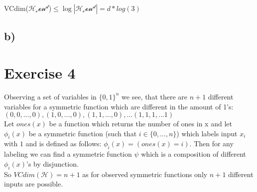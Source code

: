 \documentclass{article}
\begin{document}
VCdim($\mathcal{H_con^d}$)$\leq \log|\mathcal{H_con^d}| = d*log(3)$

\subsection*{b)}

\section*{Exercise 4}
Observing a set of variables in $\{0,1\}^n$ we see, that there are $n+1$ different variables for a symmetric function which are different in the amount of 1's: \\ ${(0,0,..., 0), (1,0,..., 0), (1,1,..., 0), ... (1,1,1, ... 1)}$ \\
Let $ones(x)$ be a function which returns the number of ones in x and let $\phi_i(x)$ be a symmetric function (such that $i\in\{0,..., n\}$) which labels input $x_i$ with $1$ and is defined as follows:
$\phi_i(x) = (ones(x) = i)$.
Then for any labeling we can find a symmetric function $\psi$ which is a composition of different  $\phi_i(x)$'s by disjunction. \\
So $VCdim(\mathcal{H}) = n+1$ as for observed symmetric functions only $n+1$ different inputs are possible.
\end{document}
